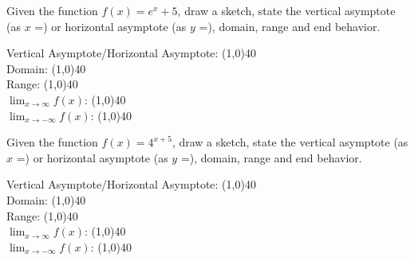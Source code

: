 \documentclass[../main.tex]{subfiles}
\begin{document}
\begin{questions}
    \newpage
    \question[1] Given the function $f(x) = e^x + 5$, draw a sketch, state the vertical asymptote (as $x$ =) or horizontal asymptote (as $y$ =), domain, range and end behavior.
    
        \begin{left} 
        \end{left}
    
    Vertical Asymptote/Horizontal Asymptote: \line(1,0){40} \\
    \newline
    Domain: \line(1,0){40} \\
    \newline
    Range: \line(1,0){40} \\
    \newline
    $\lim_{x\to\infty} f(x)$: \line(1,0){40} \\
    \newline
    $\lim_{x\to-\infty} f(x)$: \line(1,0){40} \\
    
    \question[1] Given the function $f(x) = 4^{x+5}$, draw a sketch, state the vertical asymptote (as $x$ =) or horizontal asymptote (as $y$ =), domain, range and end behavior.
    
        \begin{left} 
        \end{left}
    
    Vertical Asymptote/Horizontal Asymptote: \line(1,0){40} \\
    \newline
    Domain: \line(1,0){40} \\
    \newline
    Range: \line(1,0){40} \\
    \newline
    $\lim_{x\to\infty} f(x)$: \line(1,0){40} \\
    \newline
    $\lim_{x\to-\infty} f(x)$: \line(1,0){40} \\
    

\end{questions}
\end{document}
